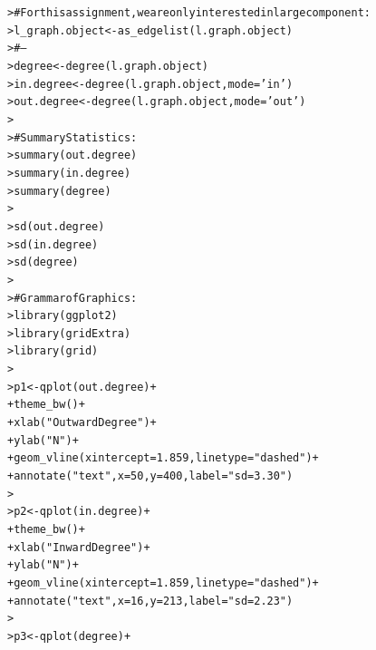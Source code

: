 \documentclass[12pt]{article}\usepackage[]{graphicx}\usepackage[]{color}
\makeatletter
\newcommand{\hlnum}[1]{\textcolor[rgb]{0.82,0.78,0.62}{#1}}%
\newcommand{\hlstr}[1]{\textcolor[rgb]{0.82,0.78,0.62}{#1}}%
\newcommand{\hlcom}[1]{\textcolor[rgb]{0.404,0.408,0.42}{#1}}%
\newcommand{\hlopt}[1]{\textcolor[rgb]{0.882,0.878,0.898}{#1}}%
\newcommand{\hlstd}[1]{\textcolor[rgb]{0.882,0.878,0.898}{#1}}%
\newcommand{\hlkwb}[1]{\textcolor[rgb]{0.902,0.675,0.196}{#1}}%
\newcommand{\hlkwc}[1]{\textcolor[rgb]{0.812,0.522,0.388}{#1}}%
\newcommand{\hlkwd}[1]{\textcolor[rgb]{0.733,0.388,0.812}{#1}}%
\newenvironment{kframe}{%
 \def\at@end@of@kframe{}%
 \ifinner\ifhmode%
  \def\at@end@of@kframe{\end{minipage}}%
  \begin{minipage}{\columnwidth}%
 \fi\fi%
 \def\FrameCommand##1{\hskip\@totalleftmargin \hskip-\fboxsep
 \colorbox{shadecolor}{##1}\hskip-\fboxsep
     \hskip-\linewidth \hskip-\@totalleftmargin \hskip\columnwidth}%
 \MakeFramed {\advance\hsize-\width
   \@totalleftmargin\z@ \linewidth\hsize
   \@setminipage}}%
 {\par\unskip\endMakeFramed%
 \at@end@of@kframe}
\newenvironment{knitrout}{}{} %
\makeatother
\begin{document}
\begin{flushleft}
\begin{center}
\begin{knitrout}
\color{fgcolor}\begin{kframe}
\begin{alltt}
\hlstd{> }\hlcom{# For this assignment, we are only interested in large component:}
\hlstd{> }\hlstd{l_graph.object} \hlkwb{<-} \hlkwd{as_edgelist}\hlstd{(l.graph.object)}
\hlstd{> }\hlcom{# --}
\hlstd{> }\hlstd{degree} \hlkwb{<-} \hlkwd{degree}\hlstd{(l.graph.object)}
\hlstd{> }\hlstd{in.degree} \hlkwb{<-} \hlkwd{degree}\hlstd{(l.graph.object,} \hlkwc{mode} \hlstd{=} \hlstr{'in'}\hlstd{)}
\hlstd{> }\hlstd{out.degree} \hlkwb{<-} \hlkwd{degree}\hlstd{(l.graph.object,} \hlkwc{mode} \hlstd{=} \hlstr{'out'}\hlstd{)}
\hlstd{> }
\hlstd{> }\hlcom{# Summary Statistics:}
\hlstd{> }\hlkwd{summary}\hlstd{(out.degree)}
\hlstd{> }\hlkwd{summary}\hlstd{(in.degree)}
\hlstd{> }\hlkwd{summary}\hlstd{(degree)}
\hlstd{> }
\hlstd{> }\hlkwd{sd}\hlstd{(out.degree)}
\hlstd{> }\hlkwd{sd}\hlstd{(in.degree)}
\hlstd{> }\hlkwd{sd}\hlstd{(degree)}
\hlstd{> }
\hlstd{> }\hlcom{# Grammar of Graphics:}
\hlstd{> }\hlkwd{library}\hlstd{(ggplot2)}
\hlstd{> }\hlkwd{library}\hlstd{(gridExtra)}
\hlstd{> }\hlkwd{library}\hlstd{(grid)}
\hlstd{> }
\hlstd{> }\hlstd{p1} \hlkwb{<-} \hlkwd{qplot}\hlstd{(out.degree)}\hlopt{+}
\hlstd{+ }     \hlkwd{theme_bw}\hlstd{()}\hlopt{+}
\hlstd{+ }     \hlkwd{xlab}\hlstd{(}\hlstr{"Outward Degree"}\hlstd{)}\hlopt{+}
\hlstd{+ }     \hlkwd{ylab}\hlstd{(}\hlstr{"N"}\hlstd{)}\hlopt{+}
\hlstd{+ }     \hlkwd{geom_vline}\hlstd{(}\hlkwc{xintercept}\hlstd{=}\hlnum{1.859}\hlstd{,} \hlkwc{linetype}\hlstd{=}\hlstr{"dashed"}\hlstd{)}\hlopt{+}
\hlstd{+ }     \hlkwd{annotate}\hlstd{(}\hlstr{"text"}\hlstd{,} \hlkwc{x} \hlstd{=} \hlnum{50}\hlstd{,} \hlkwc{y} \hlstd{=} \hlnum{400}\hlstd{,} \hlkwc{label} \hlstd{=} \hlstr{"sd = 3.30"}\hlstd{)}
\hlstd{> }
\hlstd{> }\hlstd{p2} \hlkwb{<-} \hlkwd{qplot}\hlstd{(in.degree)}\hlopt{+}
\hlstd{+ }     \hlkwd{theme_bw}\hlstd{()}\hlopt{+}
\hlstd{+ }     \hlkwd{xlab}\hlstd{(}\hlstr{"Inward Degree"}\hlstd{)}\hlopt{+}
\hlstd{+ }     \hlkwd{ylab}\hlstd{(}\hlstr{"N"}\hlstd{)}\hlopt{+}
\hlstd{+ }     \hlkwd{geom_vline}\hlstd{(}\hlkwc{xintercept}\hlstd{=}\hlnum{1.859}\hlstd{,} \hlkwc{linetype}\hlstd{=}\hlstr{"dashed"}\hlstd{)}\hlopt{+}
\hlstd{+ }     \hlkwd{annotate}\hlstd{(}\hlstr{"text"}\hlstd{,} \hlkwc{x} \hlstd{=} \hlnum{16}\hlstd{,} \hlkwc{y} \hlstd{=} \hlnum{213}\hlstd{,} \hlkwc{label} \hlstd{=} \hlstr{"sd = 2.23"}\hlstd{)}
\hlstd{> }
\hlstd{> }\hlstd{p3} \hlkwb{<-} \hlkwd{qplot}\hlstd{(degree)}\hlopt{+}

\end{alltt}
\end{kframe}
\end{knitrout}
\end{center}
\end{flushleft}
\end{document}
